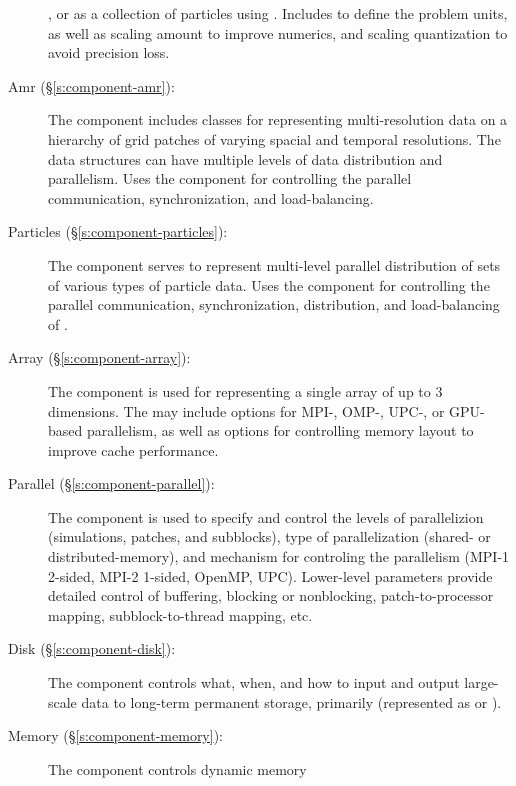 \begin{description}
        , or as a collection of particles using
        .  Includes  to define the problem
        units, as well as scaling amount to improve numerics, and
        scaling quantization to avoid precision loss.
%
 \item [Amr (\S\ref{s:component-amr}): ]
%
        The  component includes classes for representing
        multi-resolution data on a hierarchy of grid patches of
        varying spacial and temporal resolutions.  The  data
        structures can have multiple levels of data distribution and
        parallelism.  Uses the  component for
        controlling the parallel communication, synchronization, and
        load-balancing.
%
 \item [Particles (\S\ref{s:component-particles}): ]
%
        The  component serves to represent multi-level
        parallel distribution of sets of various types of particle
        data.  Uses the  component for controlling the
        parallel communication, synchronization, distribution, and
        load-balancing of .
%
 \item [Array (\S\ref{s:component-array}): ]
%
        The  component is used for representing a single
        array of up to $3$ dimensions.  The  may include
        options for MPI-, OMP-, UPC-, or GPU-based parallelism, as
        well as options for controlling memory layout to improve cache
        performance.
%
 \item [Parallel (\S\ref{s:component-parallel}): ]
%
        The  component is used to specify and control
        the levels of parallelizion (simulations, patches, and
        subblocks), type of parallelization (shared- or
        distributed-memory), and mechanism for controling the
        parallelism (MPI-1 2-sided, MPI-2 1-sided, OpenMP, UPC).
        Lower-level parameters provide detailed control of buffering,
        blocking or nonblocking, patch-to-processor mapping,
        subblock-to-thread mapping, etc.
%
 \item [Disk (\S\ref{s:component-disk}): ]
%
        The  component controls what, when, and how to
        input and output large-scale data to long-term permanent
        storage, primarily  (represented as
         or ).
%
 \item [Memory (\S\ref{s:component-memory}): ]
%
        The  component controls dynamic memory

\end{description}
